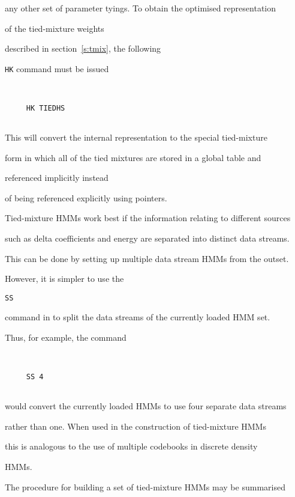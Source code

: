 any other set of parameter tyings.   To obtain the optimised representation 


of the tied-mixture weights


described in section~\ref{s:tmix}, the following 


\texttt{HK} command must be issued


\begin{verbatim}


     HK TIEDHS


\end{verbatim}


This will convert the internal representation to the special tied-mixture


form in which all of the tied mixtures are stored in a global table and


referenced implicitly instead


of being referenced explicitly using pointers.





Tied-mixture HMMs work best if the information relating to different sources


such as delta coefficients and energy are separated into distinct data streams.


This can be done by setting up multiple data stream HMMs from the outset.  


However, it is simpler to use the 


\texttt{SS}


command in  to split the data streams of the currently loaded HMM set.


Thus, for example, the command


\begin{verbatim}


     SS 4 


\end{verbatim}


would convert the currently loaded HMMs to use four separate data streams


rather than one.  When used in the construction of tied-mixture HMMs


this is analogous to the use of multiple codebooks in discrete density 


HMMs.





The procedure for building a set of tied-mixture HMMs may be summarised


